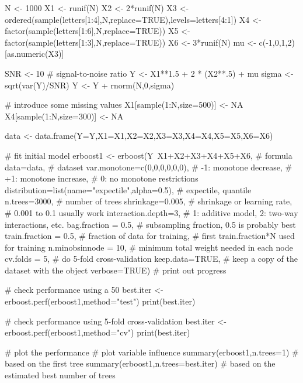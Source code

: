 \documentclass[a4paper]{book}
\begin{document}
\begin{Examples}
\begin{ExampleCode}

N <- 1000
X1 <- runif(N)
X2 <- 2*runif(N)
X3 <- ordered(sample(letters[1:4],N,replace=TRUE),levels=letters[4:1])
X4 <- factor(sample(letters[1:6],N,replace=TRUE))
X5 <- factor(sample(letters[1:3],N,replace=TRUE))
X6 <- 3*runif(N)
mu <- c(-1,0,1,2)[as.numeric(X3)]

SNR <- 10 # signal-to-noise ratio
Y <- X1**1.5 + 2 * (X2**.5) + mu
sigma <- sqrt(var(Y)/SNR)
Y <- Y + rnorm(N,0,sigma)

# introduce some missing values
X1[sample(1:N,size=500)] <- NA
X4[sample(1:N,size=300)] <- NA

data <- data.frame(Y=Y,X1=X1,X2=X2,X3=X3,X4=X4,X5=X5,X6=X6)

# fit initial model
erboost1 <- erboost(Y~X1+X2+X3+X4+X5+X6,         # formula
    data=data,                   # dataset
    var.monotone=c(0,0,0,0,0,0), # -1: monotone decrease,
                                 # +1: monotone increase,
                                 #  0: no monotone restrictions
    distribution=list(name="expectile",alpha=0.5),
                                 # expectile, quantile
    n.trees=3000,                # number of trees
    shrinkage=0.005,             # shrinkage or learning rate,
                                 # 0.001 to 0.1 usually work
    interaction.depth=3,         # 1: additive model, 2: two-way interactions, etc.
    bag.fraction = 0.5,          # subsampling fraction, 0.5 is probably best
    train.fraction = 0.5,        # fraction of data for training,
                                 # first train.fraction*N used for training
    n.minobsinnode = 10,         # minimum total weight needed in each node
    cv.folds = 5,                # do 5-fold cross-validation
    keep.data=TRUE,              # keep a copy of the dataset with the object
    verbose=TRUE)                # print out progress


# check performance using a 50%
best.iter <- erboost.perf(erboost1,method="test")
print(best.iter)

# check performance using 5-fold cross-validation
best.iter <- erboost.perf(erboost1,method="cv")
print(best.iter)

# plot the performance
# plot variable influence
summary(erboost1,n.trees=1)         # based on the first tree
summary(erboost1,n.trees=best.iter) # based on the estimated best number of trees


\end{ExampleCode}
\end{Examples}
\end{document}
